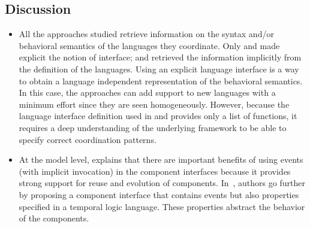 	\subsection{Discussion}
	\begin{itemize}
	
	    	\item All the approaches studied retrieve information on the syntax and/or behavioral semantics of the languages they coordinate. Only \cite{ptolemybib} and \cite{modhelxbib} made explicit the notion of interface; \cite{MarcoModels2014} and \cite{mascotbib} retrieved the information implicitly from the definition of the languages. 
	    	Using an explicit language interface is a way to obtain a language independent representation of the behavioral semantics. In this case, the approaches can add support to new languages with a minimum effort since they are seen homogeneously. However, because the language interface definition used in \cite{ptolemybib} and \cite{modhelxbib} provides only a list of functions, it requires a deep understanding of the underlying framework to be able to specify correct coordination patterns. 
	    	
	    	\item At the model level, \cite{garlansoftarchbib} explains that there are important benefits of using events (with implicit invocation) in the component interfaces because it provides strong support for reuse and evolution of components. 
	    	In~\cite{coordinainterfacebib}, authors go further by proposing a component interface that contains events but also properties specified in a temporal logic language. These properties abstract the behavior of the components.
	    	

\end{itemize}
